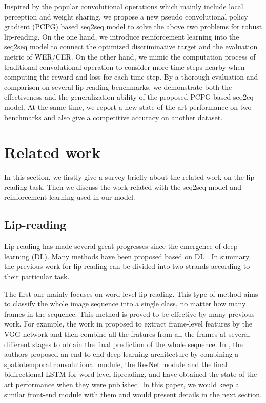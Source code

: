 \documentclass[a4paper, 10pt, conference]{ieeeconf}      %
\begin{document}
Inspired by the popular convolutional operations which mainly include local perception and weight sharing, we propose a new pseudo convolutional policy gradient (PCPG) based seq2seq model to solve the above two problems for robust lip-reading. On the one hand, we introduce reinforcement learning into the seq2seq model to connect the optimized discriminative target and the evaluation metric of WER/CER. On the other hand, we mimic the computation process of traditional convolutional operation to consider more time steps nearby when computing the reward and loss for each time step. By a thorough evaluation and comparison on several lip-reading benchmarks, we demonstrate both the effectiveness and the generalization ability of the proposed PCPG based seq2eq model. At the same time, we report a new state-of-the-art performance on two benchmarks and also give a competitive accuracy on another dataset.

\section{Related work}
In this section, we firstly give a survey briefly about the related work on the lip-reading task. Then we discuss the work related with the seq2seq model and reinforcement learning used in our model.
\subsection{Lip-reading}
Lip-reading has made several great progresses since the emergence of deep learning (DL). Many methods have been proposed based on DL \cite{Chung2018, Chung, Chung2017, B2017, Petridis2018, Assael2016, Afouras,Zhou2014, Yang2019, Hu2016}. In summary, the previous work for lip-reading can be divided into two strands according to their particular task. 

The first one mainly focuses on word-level lip-reading. This type of method aims to classify the whole image sequence into a single class, no matter how many frames in the sequence. This method is proved to be effective by many previous work. For example, the work in \cite{Chung2017} proposed to extract frame-level features by the VGG network and then combine all the fratures from all the frames at several different stages to obtain the final prediction of the whole sequence. 
In \cite{Stafylakis2017},  the authors proposed an end-to-end deep learning architecture by combining a spatiotemporal convolutional module, the ResNet module and the final bidirectional LSTM for word-level lipreading, and have obtained the state-of-the-art performance when they were published. In this paper, we would keep a similar front-end module with them and would present details in the next section. %
\end{document}
